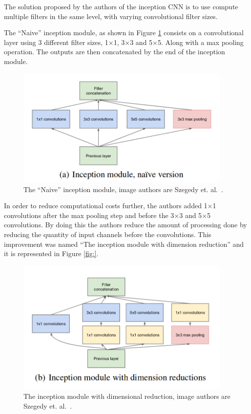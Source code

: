 The solution proposed by the authors of the inception CNN is to use compute multiple filters in the same level, with varying convolutional filter sizes.

The ``Naive'' inception module, as shown in Figure \ref{fig:naive-inception} consists on a convolutional layer using 3 different filter sizes, 1$\times$1, 3$\times$3 and 5$\times$5. Along with a max pooling operation. The outputs are then concatenated by the end of the inception module.

\begin{figure}[!ht]
    \centering
    \includegraphics[width=0.95\textwidth]{img/naive-inception.png}
    \caption{The ``Naive'' inception module, image authors are Szegedy et. al.~\cite{szegedy2015Inception}.}
    \label{fig:naive-inception}
\end{figure}

In order to reduce computational costs further, the authors added 1$\times$1 convolutions after the max pooling step and before the 3$\times$3 and 5$\times$5 convolutions. By doing this the authors reduce the amount of processing done by reducing the quantity of input channels before the convolutions. This improvement was named ``The inception module with dimension reduction'' and it is represented in Figure \ref{fig:}.  

\begin{figure}[!ht]
    \centering
    \includegraphics[width=0.95\textwidth]{img/inception-module.png}
    \caption{The inception module with dimensional reduction, image authors are Szegedy et. al.~\cite{szegedy2015Inception}.}
    \label{fig:inception}
\end{figure}

